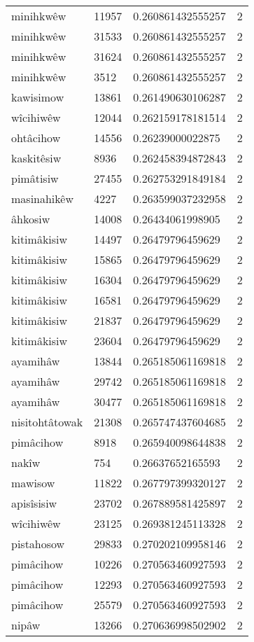 \begin{longtable}{llll}
minihkwêw & 11957 & 0.260861432555257 & 2 \\
minihkwêw & 31533 & 0.260861432555257 & 2 \\
minihkwêw & 31624 & 0.260861432555257 & 2 \\
minihkwêw & 3512 & 0.260861432555257 & 2 \\
kawisimow & 13861 & 0.261490630106287 & 2 \\
wîcihiwêw & 12044 & 0.262159178181514 & 2 \\
ohtâcihow & 14556 & 0.26239000022875 & 2 \\
kaskitêsiw & 8936 & 0.262458394872843 & 2 \\
pimâtisiw & 27455 & 0.262753291849184 & 2 \\
masinahikêw & 4227 & 0.263599037232958 & 2 \\
âhkosiw & 14008 & 0.26434061998905 & 2 \\
kitimâkisiw & 14497 & 0.26479796459629 & 2 \\
kitimâkisiw & 15865 & 0.26479796459629 & 2 \\
kitimâkisiw & 16304 & 0.26479796459629 & 2 \\
kitimâkisiw & 16581 & 0.26479796459629 & 2 \\
kitimâkisiw & 21837 & 0.26479796459629 & 2 \\
kitimâkisiw & 23604 & 0.26479796459629 & 2 \\
ayamihâw & 13844 & 0.265185061169818 & 2 \\
ayamihâw & 29742 & 0.265185061169818 & 2 \\
ayamihâw & 30477 & 0.265185061169818 & 2 \\
nisitohtâtowak & 21308 & 0.265747437604685 & 2 \\
pimâcihow & 8918 & 0.265940098644838 & 2 \\
nakîw & 754 & 0.26637652165593 & 2 \\
mawisow & 11822 & 0.267797399320127 & 2 \\
apisîsisiw & 23702 & 0.267889581425897 & 2 \\
wîcihiwêw & 23125 & 0.269381245113328 & 2 \\
pistahosow & 29833 & 0.270202109958146 & 2 \\
pimâcihow & 10226 & 0.270563460927593 & 2 \\
pimâcihow & 12293 & 0.270563460927593 & 2 \\
pimâcihow & 25579 & 0.270563460927593 & 2 \\
nipâw & 13266 & 0.270636998502902 & 2 \\

\end{longtable}
